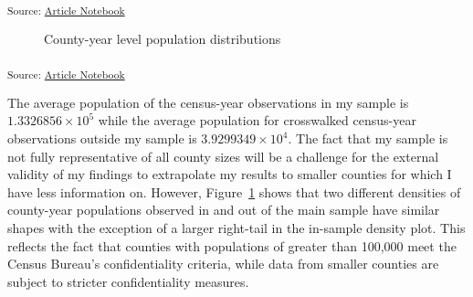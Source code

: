 \documentclass[
]{article}
\begin{document}
\textsubscript{Source:
\href{https://dyasui.github.io/FieldPaper_new/main.qmd.html}{Article
Notebook}}

\label{cell-fig-comparesamplepops}
\begin{figure}[H]


\caption{\label{fig-comparesamplepops}County-year level population
distributions}

\end{figure}%

\textsubscript{Source:
\href{https://dyasui.github.io/FieldPaper_new/main.qmd.html}{Article
Notebook}}

The average population of the census-year observations in my sample is
\ensuremath{1.3326856\times 10^{5}} while the average population for
crosswalked census-year observations outside my sample is
\ensuremath{3.9299349\times 10^{4}}. The fact that my sample is not
fully representative of all county sizes will be a challenge for the
external validity of my findings to extrapolate my results to smaller
counties for which I have less information on. However,
Figure~\ref{fig-comparesamplepops} shows that two different densities of
county-year populations observed in and out of the main sample have
similar shapes with the exception of a larger right-tail in the
in-sample density plot. This reflects the fact that counties with
populations of greater than 100,000 meet the Census Bureau's
confidentiality criteria, while data from smaller counties are subject
to stricter confidentiality measures.
\end{document}
